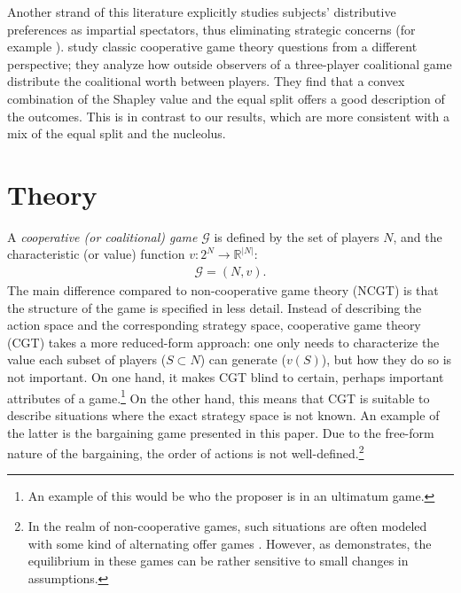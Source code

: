 Another strand of this literature explicitly studies subjects' distributive preferences as impartial spectators, thus eliminating strategic concerns (for example \cite{cappelen2007pluralism, LuhanPoulsenRoos2019, AlmasCappelenTungodden2020, ClippelRozen2022}). \textcite{ClippelRozen2022} study classic cooperative game theory questions from a different perspective; they analyze how outside observers of a three-player coalitional game distribute the coalitional worth between players. They find that a convex combination of the Shapley value and the equal split offers a good description of the outcomes. This is in contrast to our results, which are more consistent with a mix of the equal split and the nucleolus.


\section{Theory} \label{sec:theory}

A \emph{cooperative (or coalitional) game} $\mathcal{G}$ is defined by the set of players $N$, and the characteristic (or value) function $v: 2^N \to \mathbb{R}^{|N|}$:
\begin{align*}
    \mathcal{G} = (N, v).
\end{align*}
The main difference compared to non-cooperative game theory (NCGT) is that the structure of the game is specified in less detail. Instead of describing the action space and the corresponding strategy space, cooperative game theory (CGT) takes a more reduced-form approach: one only needs to characterize the value each subset of players ($S \subset N$) can generate ($v(S)$), but how they do so is not important. On one hand, it makes CGT blind to certain, perhaps important attributes of a game.\footnote{An example of this would be who the proposer is in an ultimatum game.} On the other hand, this means that CGT is suitable to describe situations where the exact strategy space is not known. An example of the latter is the bargaining game presented in this paper. Due to the free-form nature of the bargaining, the order of actions is not well-defined.\footnote{In the realm of non-cooperative games, such situations are often modeled with some kind of alternating offer games \parencite[e.g.][]{rubinstein1982perfect,gul1989bargaining}. However, as \textcite{hart1996bargaining} demonstrates, the equilibrium in these games can be rather sensitive to small changes in assumptions.}

